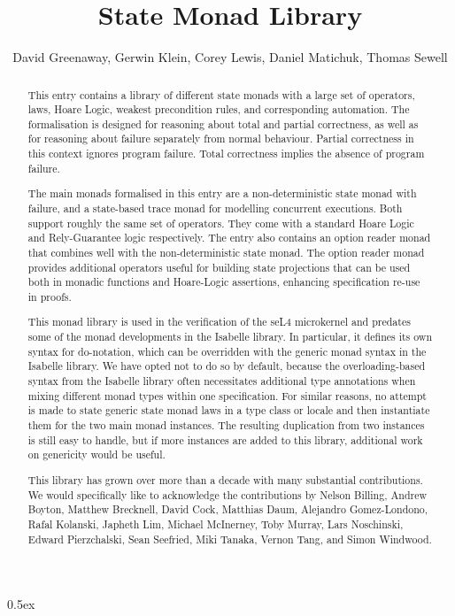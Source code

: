 \documentclass[11pt,a4paper]{article}
\begin{document}
\title{State Monad Library}
\author{David Greenaway,
  Gerwin Klein,
  Corey Lewis,
  Daniel Matichuk,
  Thomas Sewell}
\maketitle

\begin{abstract}
  This entry contains a library of different state monads with a large set of
  operators, laws, Hoare Logic, weakest precondition rules, and corresponding
  automation. The formalisation is designed for reasoning about total and
  partial correctness, as well as for reasoning about failure separately from
  normal behaviour. Partial correctness in this context ignores program failure.
  Total correctness implies the absence of program failure.

  The main monads formalised in this entry are a non-deterministic state monad
  with failure, and a state-based trace monad for modelling concurrent executions.
  Both support roughly the same set of operators. They come with a standard
  Hoare Logic and Rely-Guarantee logic respectively. The entry also contains an
  option reader monad that combines well with the non-deterministic state monad.
  The option reader monad provides additional operators useful for building
  state projections that can be used both in monadic functions and Hoare-Logic
  assertions, enhancing specification re-use in proofs.

  This monad library is used in the verification of the seL4 microkernel and
  predates some of the monad developments in the Isabelle library. In
  particular, it defines its own syntax for do-notation, which can be overridden
  with the generic monad syntax in the Isabelle library. We have opted not to do
  so by default, because the overloading-based syntax from the Isabelle library
  often necessitates additional type annotations when mixing different monad
  types within one specification. For similar reasons, no attempt is made to
  state generic state monad laws in a type class or locale and then instantiate
  them for the two main monad instances. The resulting duplication from two
  instances is still easy to handle, but if more instances are added to this
  library, additional work on genericity would be useful.

  This library has grown over more than a decade with many substantial
  contributions. We would specifically like to acknowledge the contributions by
  Nelson Billing, Andrew Boyton, Matthew Brecknell, David Cock, Matthias Daum,
  Alejandro Gomez-Londono, Rafal Kolanski, Japheth Lim, Michael McInerney, Toby
  Murray, Lars Noschinski, Edward Pierzchalski, Sean Seefried, Miki Tanaka, Vernon
  Tang, and Simon Windwood.
\end{abstract}

\tableofcontents

\parindent 0pt\parskip 0.5ex





\end{document}
